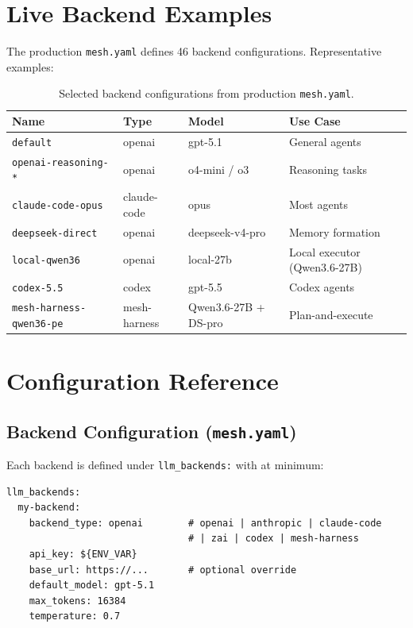 \documentclass[11pt,letterpaper]{report}
\newcommand{\code}[1]{\texttt{#1}}
\begin{document}
\section{Live Backend Examples}

The production \code{mesh.yaml} defines 46 backend configurations.
Representative examples:

\begin{table}[h]
\centering
\small
\begin{tabular}{@{}llll@{}}
\toprule
\textbf{Name} & \textbf{Type} & \textbf{Model} & \textbf{Use Case} \\
\midrule
\code{default}              & openai     & gpt-5.1              & General agents \\
\code{openai-reasoning-*}   & openai     & o4-mini / o3         & Reasoning tasks \\
\code{claude-code-opus}     & claude-code & opus                & Most agents \\
\code{deepseek-direct}      & openai     & deepseek-v4-pro      & Memory formation \\
\code{local-qwen36}         & openai     & local-27b            & Local executor (Qwen3.6-27B) \\
\code{codex-5.5}            & codex      & gpt-5.5              & Codex agents \\
\code{mesh-harness-qwen36-pe} & mesh-harness & Qwen3.6-27B + DS-pro & Plan-and-execute \\
\bottomrule
\end{tabular}
\caption{Selected backend configurations from production \code{mesh.yaml}.}
\end{table}

\section{Configuration Reference}
\label{sec:config}

\subsection{Backend Configuration (\code{mesh.yaml})}

Each backend is defined under \code{llm\_backends:} with at minimum:
\begin{lstlisting}
llm_backends:
  my-backend:
    backend_type: openai        # openai | anthropic | claude-code
                                # | zai | codex | mesh-harness
    api_key: ${ENV_VAR}
    base_url: https://...       # optional override
    default_model: gpt-5.1
    max_tokens: 16384
    temperature: 0.7
\end{lstlisting}
\end{document}
